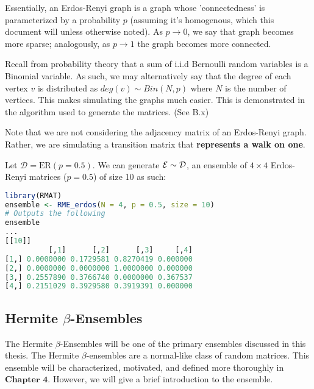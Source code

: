 Essentially, an Erdos-Renyi graph is a graph whose 'connectedness' is parameterized by a probability $p$ (assuming it's homogenous, which this document will unless otherwise noted).
As $p \to 0$, we say that graph becomes more sparse; analogously, as $p \to 1$ the graph becomes more connected.

Recall from probability theory that a sum of i.i.d Bernoulli random variables is a Binomial variable.
As such, we may alternatively say that the degree of each vertex $v$ is distributed as $deg(v) \sim Bin(N,p)$ where $N$ is the number of vertices.
This makes simulating the graphs much easier. This is demonstrated in the algorithm used to generate the matrices.  (See B.x)

\ALGerdos

\begin{warning}
Note that we are not considering the adjacency matrix of an Erdos-Renyi graph. Rather, we are simulating a transition matrix that \textbf{represents a walk on one}.
\end{warning}

\begin{code}[Erdos-Renyi p = 0.5 Ensemble]
Let $\mathcal{D} = \text{ER}(p = 0.5)$. We can generate $\mathcal{E} \sim \mathcal{D}$, an ensemble of $4 \times 4$ Erdos-Renyi matrices ($p = 0.5$) of size 10 as such:
\end{code}

\begin{lstlisting}[language=R]
library(RMAT)
ensemble <- RME_erdos(N = 4, p = 0.5, size = 10)
# Outputs the following
ensemble
...
[[10]]
          [,1]      [,2]      [,3]     [,4]
[1,] 0.0000000 0.1729581 0.8270419 0.000000
[2,] 0.0000000 0.0000000 1.0000000 0.000000
[3,] 0.2557890 0.3766740 0.0000000 0.367537
[4,] 0.2151029 0.3929580 0.3919391 0.000000
\end{lstlisting}


\subsection{Hermite $\beta$-Ensembles}

The Hermite $\beta$-Ensembles will be one of the primary ensembles discussed in this thesis. The Hermite $\beta$-ensembles are a normal-like class of random matrices. This ensemble will be characterized, motivated, and defined more thoroughly in $\textbf{Chapter 4}$. However, we will give a brief introduction to the ensemble.

